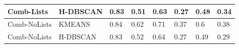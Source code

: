 \begin{landscape}
\begin{table}[h]
\begin{tabular}{|l|l|l|l|l|l|l|l|}
Comb-Lists &  H-DBSCAN & 0.83 & 0.51 & 0.63 & 0.27 & 0.48 & 0.34 \\ \hline
Comb-NoLists &  KMEANS & 0.84 & 0.62 & 0.71 & 0.37 & 0.6 & 0.38\\ \hline
Comb-NoLists & H-DBSCAN & 0.83 & 0.52 & 0.64 & 0.27 & 0.49 & 0.29\\ \hline

\end{tabular}
\end{table}



\end{landscape}
